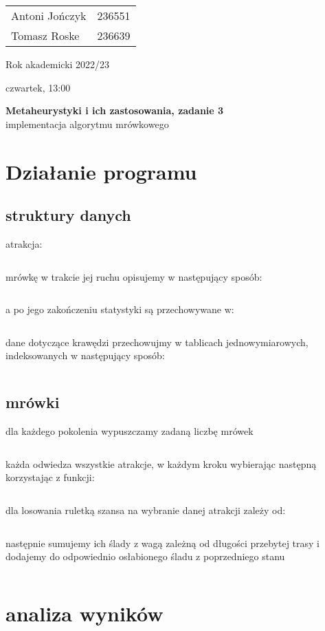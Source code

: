 \documentclass{article}
\begin{document}
\begin{minipage}{0.35\linewidth}
	\begin{tabular}{lr}
		Antoni Jończyk & 236551 \\
		Tomasz Roske   & 236639
	\end{tabular} \hfill
\end{minipage}
\hfill
\begin{minipage}{0.35\linewidth}
	\hfill Rok akademicki 2022/23 \par
	\hfill czwartek, 13:00
\end{minipage}
\bigskip \bigskip \bigskip \bigskip \bigskip
\begin{center}
	\textbf{Metaheurystyki i ich zastosowania, zadanie 3}\\
	\bigskip
	\large implementacja algorytmu mrówkowego
\end{center}
\bigskip \bigskip
\section{Działanie programu}

\subsection{struktury danych}
\indent
atrakcja:
\inputminted{fsharp}{snippets/Program.fsx_atrakcja}
mrówkę w trakcie jej ruchu opisujemy w następujący sposób:
\inputminted{fsharp}{snippets/Program.fsx_antr}
a po jego zakończeniu statystyki są przechowywane w:
\inputminted{fsharp}{snippets/Program.fsx_ants}
dane dotyczące krawędzi przechowujmy w tablicach jednowymiarowych, indeksowanych w następujący sposób:
\inputminted{fsharp}{snippets/Program.fsx_index}

\subsection{mrówki}
dla każdego pokolenia wypuszczamy zadaną liczbę mrówek
\inputminted{fsharp}{snippets/Program.fsx_advance}
każda odwiedza wszystkie atrakcje, w każdym kroku wybierając następną korzystając z funkcji:
\inputminted{fsharp}{snippets/Program.fsx_dir}
dla losowania ruletką szansa na wybranie danej atrakcji zależy od:
\inputminted{fsharp}{snippets/Program.fsx_liek}
następnie sumujemy ich ślady z wagą zależną od długości przebytej trasy i
dodajemy do odpowiednio osłabionego śladu z poprzedniego stanu
\inputminted{fsharp}{snippets/Program.fsx_trails}
\section{analiza wyników}
\end{document}

